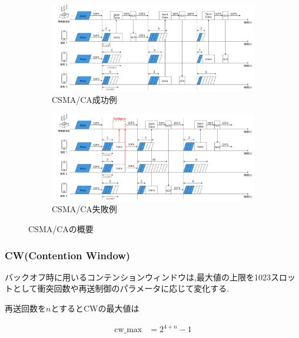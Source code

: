 \documentclass[a4paper, 10pt]{ltjsarticle}
\begin{document}
\begin{figure}[htbp]
  \centering

  \begin{subfigure}{\columnwidth}
    \centering
    \includegraphics[width=1\columnwidth]{./assets/csma-ca-s.png}
    \caption{CSMA/CA成功例}
    \label{1a}
  \end{subfigure}


  \begin{subfigure}{\columnwidth}
    \centering
    \includegraphics[width=1\columnwidth]{./assets/csma-ca-f.png}
    \caption{CSMA/CA失敗例}
    \label{1b}
  \end{subfigure}


  \caption{CSMA/CAの概要}
  \label{CSMA/CA}
\end{figure}

\subsubsection{CW(Contention Window)}

バックオフ時に用いるコンテンションウィンドウは,最大値の上限を1023スロットとして衝突回数や再送制御のパラメータに応じて変化する.

再送回数を$n$とするとCWの最大値は



\begin{align}
  \text{cw\_max} &= 2^{4 + n} - 1
\end{align}
\end{document}
